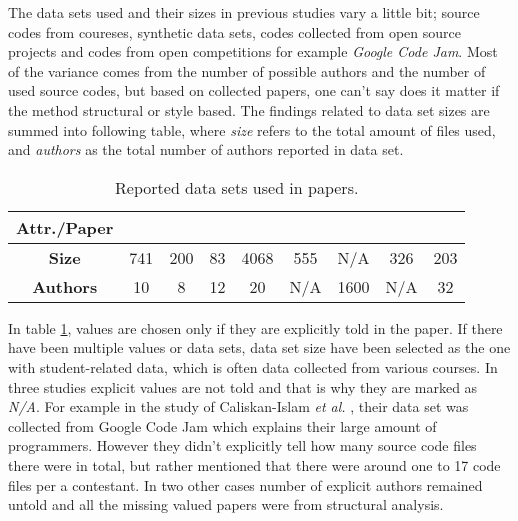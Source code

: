 \documentclass[english]{tktltiki2}
\theoremstyle{definition}
\theoremstyle{remark}
\begin{document}
The data sets used and their sizes in previous studies vary a little bit; source codes from coureses, synthetic data sets, codes collected from open source projects and codes from open competitions for example \textit{Google Code Jam}.  Most of the variance comes from the number of possible authors and the number of used source codes, but based on collected papers, one can't say does it matter if the method structural or style based. The findings related to data set sizes are summed into following table, where \textit{size} refers to the total amount of files used, and \textit{authors} as the total number of authors reported in data set. 

\begin{table}[ht]
\centering
\begin{tabular}{c|cccccccc}
\textbf{Attr./Paper} & \cite{bandara2011machine}   & \cite{kothari2007probabilistic}   & \cite{Elenbogen:2008:DOS:1295109.1295123}  & \cite{lange2007using}    & \cite{Son:2013:APS:2508269.2508323}   & \cite{caliskan2015anonymizing}    & \cite{jadalla2008pde4java}   & \cite{rosenblum2011wrote}   \\ \hline
\textbf{Size}        & 741 & 200 & 83 & 4068 & 555 & N/A  & 326 & 203 \\
\textbf{Authors}     & 10  & 8   & 12 & 20   & N/A & 1600 & N/A & 32 
\end{tabular}
\caption{Reported data sets used in papers.}
\label{table:data}
\end{table}

\noindent
In table \ref{table:data}, values are chosen only if they are explicitly told in the paper. If there have been multiple values or data sets, data set size have been selected as the one with student-related data, which is often data collected from various courses. In three studies explicit values are not told and that is why they are marked as \textit{N/A}. For example in the study of Caliskan-Islam \textit{et al.} \cite{caliskan2015anonymizing}, their data set was collected from Google Code Jam which explains their large amount of programmers. However they didn't explicitly tell how many source code files there were in total, but rather mentioned that there were around one to 17 code files per a contestant. In two other cases number of explicit authors remained untold and all the missing valued papers were from structural analysis. 
\end{document}
